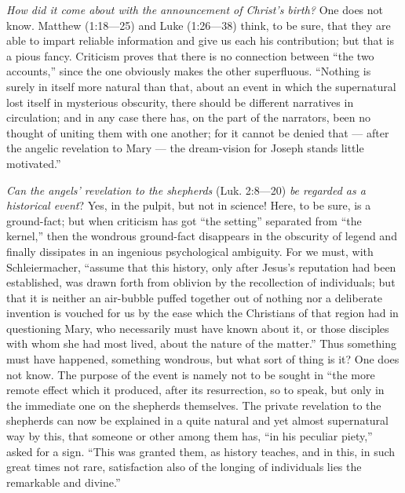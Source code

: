 \documentclass[12pt,a4paper,openany]{book}
\newcommand{\opage}[1]{\marginnote{\footnotesize\textit{[#1]}}}
\begin{document}
\emph{How did it come about with the announcement
of Christ's birth?} One does not know. Matthew
(1:18—25) and Luke (1:26—38) think, to be sure, that they are able to
impart reliable information and give us each
his contribution; but that is a pious fancy. Criticism
proves that there is no connection between ``the two
accounts,'' since the one obviously makes the other
superfluous. ``Nothing is surely in itself more natural than
that, about an event in which the supernatural lost
itself in mysterious obscurity, there should be different
\setcounter{footnote}{0}%
\opage{310}narratives in circulation; and in any case there has, on the part of the narrators,
been no thought of uniting them
with one another; for it cannot be denied that --- after the
angelic revelation to Mary --- the dream-vision for Joseph
stands little motivated.''

\emph{Can the angels' revelation to the shepherds}
(Luk. 2:8—20) \emph{be regarded as a historical event}?
Yes, in the pulpit, but not in science!
Here, to be sure, is a ground-fact; but when criticism has
got ``the setting'' separated from ``the kernel,'' then
the wondrous ground-fact disappears in the obscurity of legend
and finally dissipates in an ingenious psychological ambiguity.
For we must, with Schleiermacher, ``assume that this
history, only after Jesus's reputation had been established,
was drawn forth from oblivion by the recollection of individuals;
but that it is neither an air-bubble puffed together out of nothing
nor a deliberate invention is vouched
for us by the ease which the Christians of that region had in
questioning Mary, who necessarily must have known about
it, or those disciples with whom she had most
lived, about the nature of the matter.'' Thus something must
have happened, something wondrous, but what sort of thing is it?
One does not know. The purpose of the event is
namely not to be sought in ``the more remote effect which it
produced, after its resurrection, so to speak, but
only in the immediate one on the shepherds themselves. The private revelation
to the shepherds can now be explained in a quite
natural and yet almost supernatural way by this, that someone
or other among them has, ``in his peculiar piety,''
asked for a sign. ``This was granted them, as history
teaches, and in this, in such great times not rare,
\setcounter{footnote}{0}%
\opage{311}satisfaction also of the longing of individuals lies the remarkable and divine.''
\end{document}
